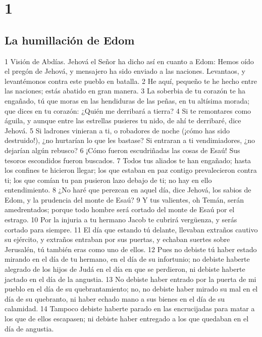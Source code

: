 

\chapter{1}

\section*{La humillación de Edom}

1 Visión de Abdías. Jehová el Señor ha dicho así en cuanto a Edom: Hemos oído el pregón de Jehová, y mensajero ha sido enviado a las naciones. Levantaos, y levantémonos contra este pueblo en batalla.
2 He aquí, pequeño te he hecho entre las naciones; estás abatido en gran manera.
3 La soberbia de tu corazón te ha engañado, tú que moras en las hendiduras de las peñas, en tu altísima morada; que dices en tu corazón: ¿Quién me derribará a tierra?
4 Si te remontares como águila, y aunque entre las estrellas pusieres tu nido, de ahí te derribaré, dice Jehová.
5 Si ladrones vinieran a ti, o robadores de noche (¡cómo has sido destruido!), ¿no hurtarían lo que les bastase? Si entraran a ti vendimiadores, ¿no dejarían algún rebusco?
6 ¡Cómo fueron escudriñadas las cosas de Esaú! Sus tesoros escondidos fueron buscados.
7 Todos tus aliados te han engañado; hasta los confines te hicieron llegar; los que estaban en paz contigo prevalecieron contra ti; los que comían tu pan pusieron lazo debajo de ti; no hay en ello entendimiento.
8 ¿No haré que perezcan en aquel día, dice Jehová, los sabios de Edom, y la prudencia del monte de Esaú?
9 Y tus valientes, oh Temán, serán amedrentados; porque todo hombre será cortado del monte de Esaú por el estrago.
10 Por la injuria a tu hermano Jacob te cubrirá vergüenza, y serás cortado para siempre.
11 El día que estando tú delante, llevaban extraños cautivo su ejército, y extraños entraban por sus puertas, y echaban suertes sobre Jerusalén, tú también eras como uno de ellos.
12 Pues no debiste tú haber estado mirando en el día de tu hermano, en el día de su infortunio; no debiste haberte alegrado de los hijos de Judá en el día en que se perdieron, ni debiste haberte jactado en el día de la angustia.
13 No debiste haber entrado por la puerta de mi pueblo en el día de su quebrantamiento; no, no debiste haber mirado su mal en el día de su quebranto, ni haber echado mano a sus bienes en el día de su calamidad.
14 Tampoco debiste haberte parado en las encrucijadas para matar a los que de ellos escapasen; ni debiste haber entregado a los que quedaban en el día de angustia.

